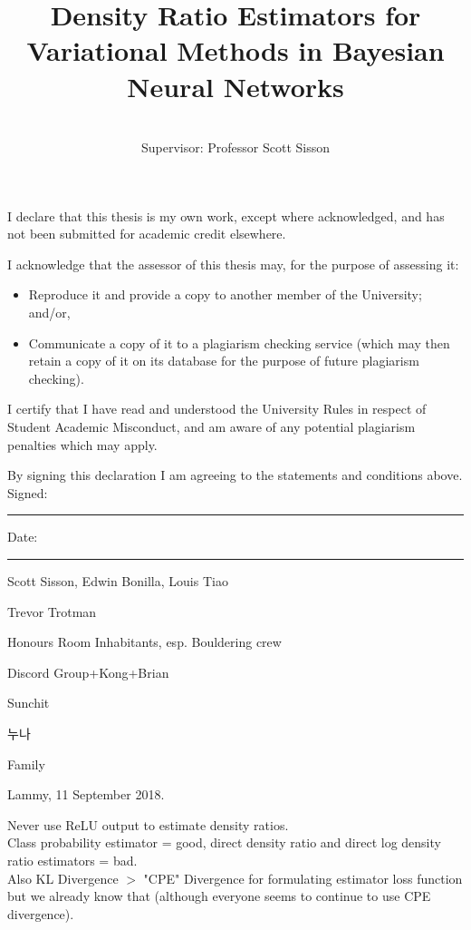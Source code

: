 \documentclass[honours,12pt]{unswthesis}
\title{Density Ratio Estimators for Variational Methods in Bayesian Neural Networks}
\author{\Authornameonly\\{\bigskip}Supervisor: Professor Scott Sisson}
\newcommand\blankpage{%
    \null
    \thispagestyle{empty}%
    \addtocounter{page}{-1}%
    \newpage}
\numberwithin{equation}{section}
\theoremstyle{definition}
\begin{document}
\beforepreface

\afterpage{\blankpage}



\vskip 10pc \noindent I declare that this thesis is my
own work, except where acknowledged, and has not been submitted for
academic credit elsewhere. 

\vskip 2pc  \noindent I acknowledge that the assessor of this
thesis may, for the purpose of assessing it:
\begin{itemize}
\item Reproduce it and provide a copy to another member of the University; and/or,
\item Communicate a copy of it to a plagiarism checking service (which may then retain a copy of it on its database for the purpose of future plagiarism checking).
\end{itemize}

\vskip 2pc \noindent I certify that I have read and understood the University Rules in
respect of Student Academic Misconduct, and am aware of any potential plagiarism penalties which may 
apply.\vspace{24pt}

\vskip 2pc \noindent By signing 
this declaration I am
agreeing to the statements and conditions above.
\vskip 2pc \noindent
Signed: \rule{7cm}{0.25pt} \hfill Date: \rule{4cm}{0.25pt} \newline
\vskip 1pc

\afterpage{\blankpage}




{\bigskip}Scott Sisson, Edwin Bonilla, Louis Tiao

{\bigskip\noindent}Trevor Trotman

{\bigskip\noindent}Honours Room Inhabitants, esp. Bouldering crew

{\bigskip\noindent}Discord Group+Kong+Brian

{\bigskip\noindent}Sunchit

{\bigskip\noindent}누나

{\bigskip\noindent}Family

{\bigskip\bigskip\bigskip\noindent} Lammy, 11 September 2018.

\afterpage{\blankpage}


Never use ReLU output to estimate density ratios.\\
Class probability estimator = good, direct density ratio and direct log density ratio estimators = bad.\\ 
Also KL Divergence $>$ "CPE" Divergence for formulating estimator loss function but we already know that (although everyone seems to continue to use CPE divergence).
\afterpage{\blankpage}
\end{document}

